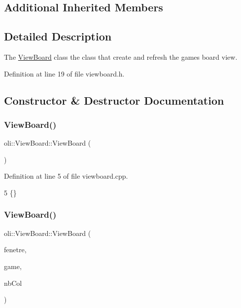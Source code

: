 \subsection*{Additional Inherited Members}


\subsection{Detailed Description}
The \hyperlink{classoli_1_1_view_board}{View\+Board} class the class that create and refresh the game\textquotesingle{}s board view. 

Definition at line 19 of file viewboard.\+h.



\subsection{Constructor \& Destructor Documentation}
\hypertarget{classoli_1_1_view_board_a36385a4f3f367326ad864c64e6dff4bc}{}\label{classoli_1_1_view_board_a36385a4f3f367326ad864c64e6dff4bc} 
\subsubsection{\texorpdfstring{View\+Board()}{ViewBoard()}\hspace{0.1cm}{\footnotesize\ttfamily [1/2]}}
{\footnotesize\ttfamily oli\+::\+View\+Board\+::\+View\+Board (\begin{DoxyParamCaption}{ }\end{DoxyParamCaption})}



Definition at line 5 of file viewboard.\+cpp.


\begin{DoxyCode}
5 \{\}
\end{DoxyCode}
\hypertarget{classoli_1_1_view_board_a0d4a844b1b5450ab623a747b7ced2e59}{}\label{classoli_1_1_view_board_a0d4a844b1b5450ab623a747b7ced2e59} 
\subsubsection{\texorpdfstring{View\+Board()}{ViewBoard()}\hspace{0.1cm}{\footnotesize\ttfamily [2/2]}}
{\footnotesize\ttfamily oli\+::\+View\+Board\+::\+View\+Board (\begin{DoxyParamCaption}\item[{Q\+Widget \&}]{fenetre,  }\item[{\hyperlink{classoli_1_1_floodgame}{Floodgame} $\ast$}]{game,  }\item[{int}]{nb\+Col }\end{DoxyParamCaption})}



